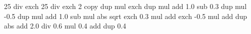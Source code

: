 {\pgfpoint{-25bp}{-25bp}}
{\pgfpoint{+25bp}{+25bp}}{}{
  25 div exch  25 div exch 
  2 copy 
  dup mul exch dup mul add 1.0 sub
  0.3 dup mul -0.5 dup mul add 1.0 sub 
  mul abs sqrt
  exch 0.3 mul add exch -0.5 mul add dup abs add 2.0 div 
  0.6 mul 0.4 add dup 0.4
}

